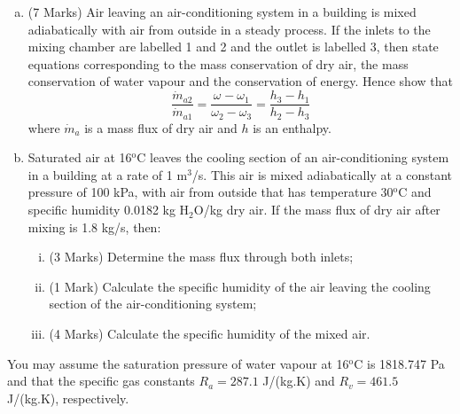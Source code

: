 \documentclass[12pt,twoside]{report}
\newcommand{\frc}{\displaystyle\frac}
\begin{document}
\begin{description}
\begin{enumerate}[(a)]
\item (7 Marks) Air leaving an air-conditioning system in a building is mixed adiabatically with air from outside in a steady process. If the inlets to the mixing chamber are labelled 1 and 2 and the outlet is labelled 3, then state equations corresponding to the mass conservation of dry air, the mass conservation of water vapour and the conservation of energy. Hence show that
\begin{displaymath}
\frc{\dot{m}_{a2}}{\dot{m}_{a1}} = \frc{\omega_{}-\omega_{1}}{\omega_{2}-\omega_{3}} = \frc{h_{3}-h_{1}}{h_{2}-h_{3}}
\end{displaymath}
where $\dot{m}_{a}$  is a mass flux of dry air and $h$ is an enthalpy.
\medskip

\item Saturated air at 16$^{\text{o}}$C leaves the cooling section of an air-conditioning system in a building at a rate of 1 m$^{3}$/s. This air is mixed adiabatically at a constant pressure of 100 kPa, with air from outside that has temperature 30$^{\text{o}}$C and specific humidity 0.0182 kg H$_{2}$O/kg dry air. If the mass flux of dry air after mixing is 1.8 kg/s, then:
\begin{enumerate}[(i)]
\item (3 Marks) Determine the mass flux through both inlets;
\item (1 Mark)  Calculate the specific humidity of the air leaving the cooling section of the air-conditioning system;
\item (4 Marks)  Calculate the specific humidity of the mixed air. 
\end{enumerate}
\end{enumerate}
You may assume the saturation pressure of water vapour at 16$^{\text{o}}$C is 1818.747 Pa and that the specific gas constants $R_{a}=287.1$ J/(kg.K) and $R_{v}=461.5$ J/(kg.K), respectively.
\end{description}

%
%
%
%
\end{document}
